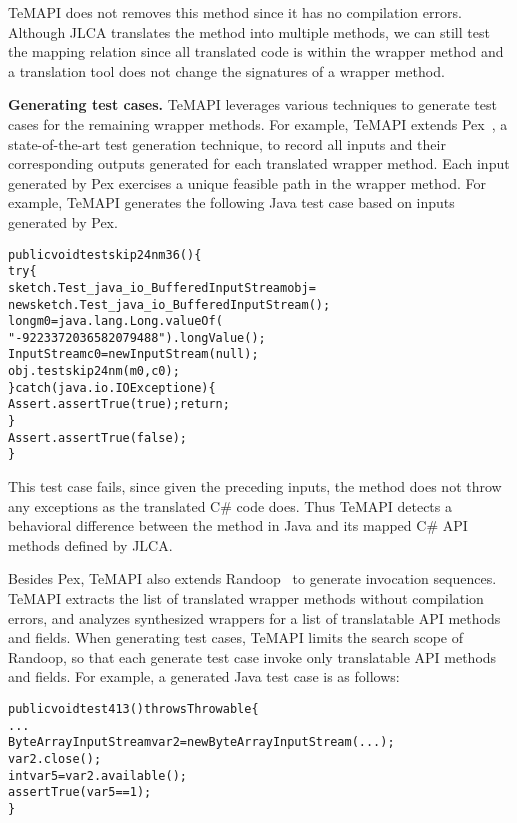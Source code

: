 TeMAPI does not removes this method since it has no compilation errors. Although JLCA translates the  method into multiple methods, we can still test the mapping relation since all translated code is within the wrapper method and a translation tool does not change the signatures of a wrapper method.  

\textbf{Generating test cases.} TeMAPI leverages various techniques to generate test cases for the remaining wrapper methods. For example, TeMAPI extends Pex~\cite{tillmann2008pex}, a state-of-the-art test generation technique, to record all inputs and their corresponding outputs generated for each translated wrapper method. Each input generated by Pex exercises a unique feasible path in the wrapper method. For example, TeMAPI generates the following Java test case based on inputs generated by Pex.

\begin{CodeOut}\vspace*{-1ex}
\begin{alltt}
public void testskip24nm36()\{
  try\{
     sketch.Test_java_io_BufferedInputStream obj = 
        new sketch.Test_java_io_BufferedInputStream();
     long m0 = java.lang.Long.valueOf(
                  "-9223372036582079488").longValue();
     InputStream c0 = new InputStream(null);
     obj.testskip24nm(m0,c0);
  \}catch(java.io.IOException e)\{
     Assert.assertTrue(true);return;
  \}
  Assert.assertTrue(false);
\}
\end{alltt}
\end{CodeOut}\vspace*{-2ex}

This test case fails, since given the preceding inputs, the  method does not throw any exceptions as the translated C\# code does. Thus TeMAPI detects a behavioral difference between the  method in Java and its mapped C\# API methods defined by JLCA.

Besides Pex, TeMAPI also extends Randoop~\cite{pacheco2007feedback} to generate invocation sequences. TeMAPI extracts the list of translated wrapper methods without compilation errors, and analyzes synthesized wrappers for a list of translatable API methods and fields. When generating test cases, TeMAPI limits the search scope of Randoop, so that each generate test case invoke only translatable API methods and fields. For example, a generated Java test case is as follows:

\begin{CodeOut}\vspace*{-1ex}
\begin{alltt}
public void test413() throws Throwable\{
  ...
  ByteArrayInputStream var2=new ByteArrayInputStream(...);
  var2.close();
  int var5=var2.available();
  assertTrue(var5 == 1);
\}
\end{alltt}
\end{CodeOut}\vspace*{-2ex}


